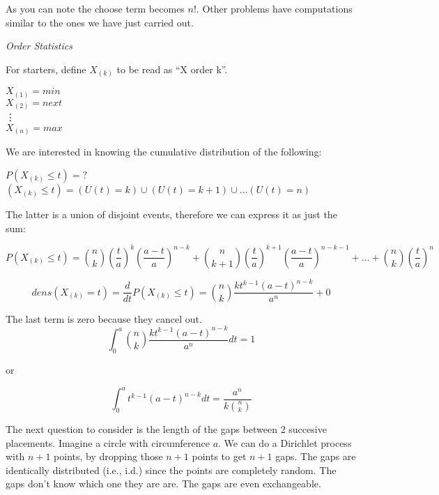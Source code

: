 As you can note the choose term becomes $n!$.  Other problems have computations
similar to the ones we have just carried out.

{\em Order Statistics}

For starters, define $X_{(k)}$ to be read as ``X order k''.

$X_{(1)} = min$\\
$X_{(2)}=next$\\
\vdots \\
$X_{(n)}=max$

We are interested in knowing the cumulative distribution of the following:

$P(X_{(k)} \leq t) = ?$
$(X_{(k)} \leq t ) = (U(t) = k) \cup (U(t) = k + 1) \cup \ldots (U(t) = n)$

The latter is a union of disjoint events, therefore we can express it as just the sum:

\begin{displaymath}
P(X_{(k)} \leq t) ={{n}\choose{k}}\left( \frac {t} {a} \right)^k \left( \frac {a-t} {a} \right)^{n-k} +  {{n}\choose{k+1}} \left( \frac {t} {a} \right)^{k+1} \left( \frac {a-t} {a} \right)^{n-k-1} + \ldots + {{n}\choose{k}} \left( \frac {t} {a} \right)^n
\end{displaymath}

\begin{displaymath}
dens(X_{(k)} = t ) = \frac {d} {dt} P(X_{(k)} \leq t) = {n\choose k} \frac {kt^{k-1}(a-t)^{n-k}} {a^n} + 0
\end{displaymath}

The last term is zero because they cancel out.
\begin{displaymath}
\int_{0}^{a} {{n}\choose {k}}\frac {kt^{k-1} (a-t)^{n-k}} {a^n} dt = 1
\end{displaymath}

or

\begin{displaymath}
\int_{0}^{a} t^{k-1} (a-t)^{n-k} dt = \frac {a^n} {k {n\choose k}}
\end{displaymath}

The next question to consider is the length of the gaps between 2 succesive placements.  Imagine a circle with circumference $a$.  We can do a Dirichlet process with $n+1$ points, by dropping those $n+1$ points to get $n+1$ gaps.  The gaps are identically distributed (i.e., i.d.) since the points are completely random.  The gaps don't know which one they are are.  The gaps are even exchangeable.

